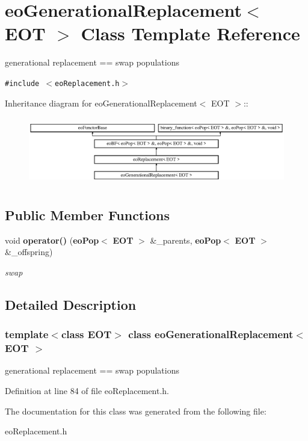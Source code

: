 \section{eo\-Generational\-Replacement$<$ EOT $>$ Class Template Reference}
\label{classeo_generational_replacement}
generational replacement == swap populations  


{\tt \#include $<$eo\-Replacement.h$>$}

Inheritance diagram for eo\-Generational\-Replacement$<$ EOT $>$::\begin{figure}[H]
\begin{center}
\leavevmode
\includegraphics[height=3.01075cm]{classeo_generational_replacement}
\end{center}
\end{figure}
\subsection*{Public Member Functions}
\begin{CompactItemize}
\item 
void {\bf operator()} ({\bf eo\-Pop}$<$ {\bf EOT} $>$ \&\_\-parents, {\bf eo\-Pop}$<$ {\bf EOT} $>$ \&\_\-offspring)\label{classeo_generational_replacement_a0}

\begin{CompactList}\small\item\em swap \item\end{CompactList}\end{CompactItemize}


\subsection{Detailed Description}
\subsubsection*{template$<$class EOT$>$ class eo\-Generational\-Replacement$<$ EOT $>$}

generational replacement == swap populations 



Definition at line 84 of file eo\-Replacement.h.

The documentation for this class was generated from the following file:\begin{CompactItemize}
\item 
eo\-Replacement.h\end{CompactItemize}
